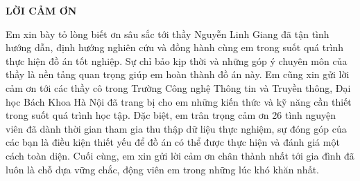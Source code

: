 \documentclass[../DoAn.tex]{subfiles}
\begin{document}
\begin{center}
    \Large{\textbf{LỜI CẢM ƠN}}\\
\end{center}
\vspace{1cm}
Em xin bày tỏ lòng biết ơn sâu sắc tới thầy Nguyễn Linh Giang đã tận tình hướng dẫn, định hướng nghiên cứu và đồng hành cùng em trong suốt quá trình thực hiện đồ án tốt nghiệp. Sự chỉ bảo kịp thời và những góp ý chuyên môn của thầy là nền tảng quan trọng giúp em hoàn thành đồ án này. Em cũng xin gửi lời cảm ơn tới các thầy cô trong Trường Công nghệ Thông tin và Truyền thông, Đại học Bách Khoa Hà Nội đã trang bị cho em những kiến thức và kỹ năng cần thiết trong suốt quá trình học tập. Đặc biệt, em trân trọng cảm ơn 26 tình nguyện viên đã dành thời gian tham gia thu thập dữ liệu thực nghiệm, sự đóng góp của các bạn là điều kiện thiết yếu để đồ án có thể được thực hiện và đánh giá một cách toàn diện. Cuối cùng, em xin gửi lời cảm ơn chân thành nhất tới gia đình đã luôn là chỗ dựa vững chắc, động viên em trong những lúc khó khăn nhất.
\end{document}
